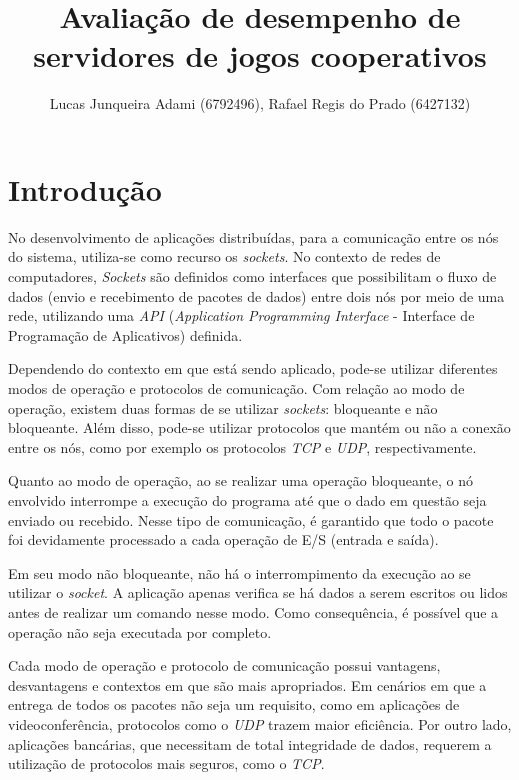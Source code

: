 \documentclass[12pt]{article}
\title{Avaliação de desempenho de servidores de jogos cooperativos}
\author{Lucas Junqueira Adami (6792496)\inst{1}, Rafael Regis do Prado (6427132)\inst{1}}
\begin{document}
 

\maketitle

\begin{resumo} %
\end{resumo}

\section{Introdução} \label{sec:introcao}

No desenvolvimento de aplicações distribuídas, para a comunicação entre os nós
do sistema, utiliza-se como recurso os \emph{sockets}. No contexto de redes de
computadores, \emph{Sockets} são definidos como interfaces que possibilitam o
fluxo de dados (envio e recebimento de pacotes de dados) entre dois nós por
meio de uma rede, utilizando uma \emph{API} (\emph{Application Programming
Interface} - Interface de Programação de Aplicativos) definida.

Dependendo do contexto em que está sendo aplicado, pode-se utilizar diferentes
modos de operação e protocolos de comunicação. Com relação ao modo de operação,
existem duas formas de se utilizar \emph{sockets}: bloqueante e não bloqueante.
Além disso, pode-se utilizar protocolos que mantém ou não a conexão entre os
nós, como por exemplo os protocolos \emph{TCP} e \emph{UDP}, respectivamente.

Quanto ao modo de operação, ao se realizar uma operação bloqueante, o nó
envolvido interrompe a execução do programa até que o dado em questão seja
enviado ou recebido. Nesse tipo de comunicação, é garantido que todo o pacote
foi devidamente processado a cada operação de E/S (entrada e saída).

Em seu modo não bloqueante, não há o interrompimento da execução ao se utilizar
o \emph{socket}. A aplicação apenas verifica se há dados a serem escritos ou
lidos antes de realizar um comando nesse modo. Como consequência, é possível
que a operação não seja executada por completo. 

Cada modo de operação e protocolo de comunicação possui vantagens, desvantagens
e contextos em que são mais apropriados. Em cenários em que a entrega de todos
os pacotes não seja um requisito, como em aplicações de videoconferência,
protocolos como o \emph{UDP} trazem maior eficiência. Por outro lado,
aplicações bancárias, que necessitam de total integridade de dados, requerem a
utilização de protocolos mais seguros, como o \emph{TCP}.
\end{document}
